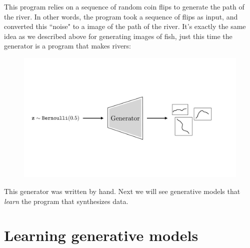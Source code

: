 This program relies on a sequence of random coin flips to generate the path of the river. In other words, the program took a sequence of flips as input, and converted this ``noise" to a image of the path of the river. It's exactly the same idea as we described above for generating images of fish, just this time the generator is a program that makes rivers:
\begin{figure}[h]
    \centering
    \includegraphics[width=0.7\linewidth]{./figures/generative_models/gen_model_of_rivers_diagram.pdf}
    \label{fig:generative_models:gen_model_of_rivers_diagram}
\end{figure}

This generator was written by hand. Next we will see generative models that \textit{learn} the program that synthesizes data.%

\section{Learning generative models}

